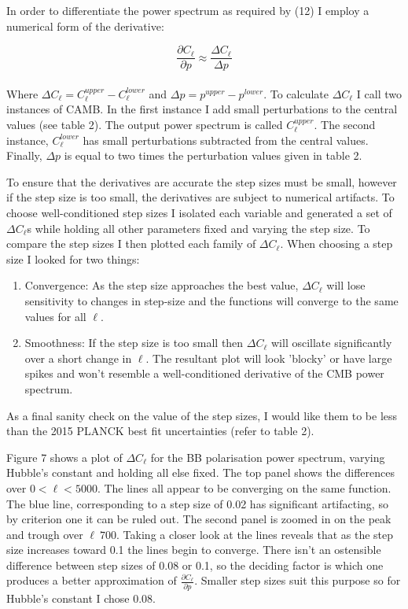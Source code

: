 In order to differentiate the power spectrum as required by (12) I employ a numerical form of the derivative:

\begin{equation}
\frac{\partial C_{\ell}}{\partial p} \approx \frac{\Delta C_{\ell}}{\Delta p}
\end{equation}
\\
Where $\Delta C_{\ell} = C^{upper}_{\ell} - C^{lower}_{\ell}$ and $\Delta p = p^{upper} - p^{lower}$. To calculate $\Delta C_{\ell}$ I call two instances of CAMB. In the first instance I add small perturbations to the central values (see table 2). The output power spectrum is called $C^{upper}_{\ell}$. The second instance, $C^{lower}_{\ell}$ has small perturbations subtracted from the central values. Finally, $\Delta p$ is equal to two times the perturbation values given in table 2.

To ensure that the derivatives are accurate the step sizes must be small, however if the step size is too small, the derivatives are subject to numerical artifacts. To choose well-conditioned step sizes I isolated each variable and generated a set of $\Delta C_{\ell}$s while holding all other parameters fixed and varying the step size. To compare the step sizes I then plotted each family of $\Delta C_{\ell}$. When choosing a step size I looked for two things:

\begin{enumerate}
\item Convergence: As the step size approaches the best value, $\Delta C_{\ell}$ will lose sensitivity to changes in step-size and the functions will converge to the same values for all $\ell$.

\item Smoothness: If the step size is too small then $\Delta C_{\ell}$ will oscillate significantly over a short change in $\ell$. The resultant plot will look 'blocky' or have large spikes and won't resemble a well-conditioned derivative of the CMB power spectrum.
\end{enumerate}

As a final sanity check on the value of the step sizes, I would like them to be less than the 2015 PLANCK best fit uncertainties (refer to table 2).

Figure 7 shows a plot of $\Delta C_{\ell}$ for the BB polarisation power spectrum, varying Hubble's constant and holding all else fixed. The top panel shows the differences over $ 0 < \ell < 5000$. The lines all appear to be converging on the same function. The blue line, corresponding to a step size of 0.02 has significant artifacting, so by criterion one it can be ruled out. The second panel is zoomed in on the peak and trough over $\ell ~ 700$. Taking a closer look at the lines reveals that as the step size increases toward 0.1 the lines begin to converge. There isn't an ostensible difference between step sizes of 0.08 or 0.1, so the deciding factor is which one produces a better approximation of $\frac{\partial C_{\ell}}{\partial p}$. Smaller step sizes suit this purpose so for Hubble's constant I chose 0.08.

